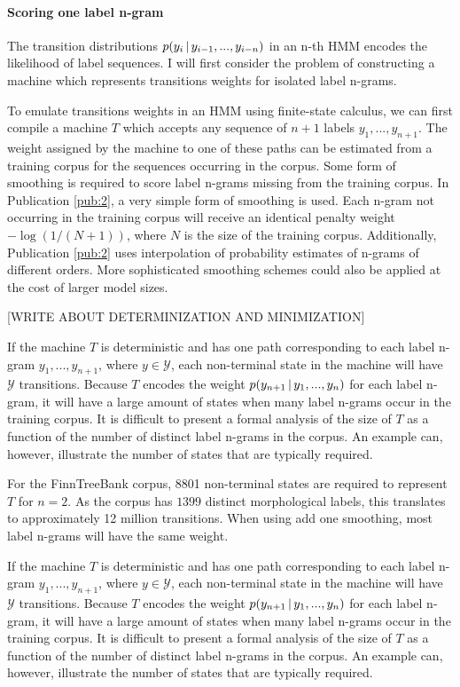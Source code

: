 \paragraph{Scoring one label n-gram} The transition distributions $p(y_i\mbox{$ \, | \, $}
y_{i - 1}, ..., y_{i - n})$ in an n-th HMM encodes the likelihood of
label sequences. I will first consider the problem of constructing a
machine which represents transitions weights for isolated label
n-grams. 

To emulate transitions weights in an HMM using finite-state calculus,
we can first compile a machine $T$ which accepts any sequence of $n+1$
labels $y_{1}, ..., y_{n+1}$. The weight assigned by the machine to
one of these paths can be estimated from a training corpus for the
sequences occurring in the corpus. Some form of smoothing is required
to score label n-grams missing from the training corpus. In
Publication \ref{pub:2}, a very simple form of smoothing is used. Each
n-gram not occurring in the training corpus will receive an identical
penalty weight $-\log(1/(N+1))$, where $N$ is the size of the training
corpus. Additionally, Publication \ref{pub:2} uses interpolation of
probability estimates of n-grams of different orders. More
sophisticated smoothing schemes could also be applied at the cost of
larger model sizes.

[WRITE ABOUT DETERMINIZATION AND MINIMIZATION]

If the machine $T$ is deterministic and has one path corresponding to
each label n-gram $y_1, ..., y_{n+1}$, where $y \in \mathcal{Y}$, each
non-terminal state in the machine will have $\mathcal{Y}$
transitions. Because $T$ encodes the weight $p(y_{n+1}\mbox{$ \, | \, $} y_{1},
..., y_{n})$ for each label n-gram, it will have a large amount of
states when many label n-grams occur in the training corpus. It is
difficult to present a formal analysis of the size of $T$ as a
function of the number of distinct label n-grams in the corpus. An
example can, however, illustrate the number of states that are
typically required.

For the FinnTreeBank corpus, 8801 non-terminal states are required to
represent $T$ for $n=2$. As the corpus has $1399$ distinct
morphological labels, this translates to approximately 12 million
transitions. When using add one smoothing, most label n-grams will
have the same weight.

If the machine $T$ is deterministic and has one path
corresponding to each label n-gram $y_1, ..., y_{n+1}$, where $y \in
\mathcal{Y}$, each non-terminal state in the machine will have
$\mathcal{Y}$ transitions. Because $T$ encodes the weight
$p(y_{n+1}\mbox{$ \, | \, $} y_{1}, ..., y_{n})$ for each label n-gram, it will
have a large amount of states when many label n-grams occur in the
training corpus. It is difficult to present a formal analysis of the
size of $T$ as a function of the number of distinct label n-grams in
the corpus. An example can, however, illustrate the number of states
that are typically required.


